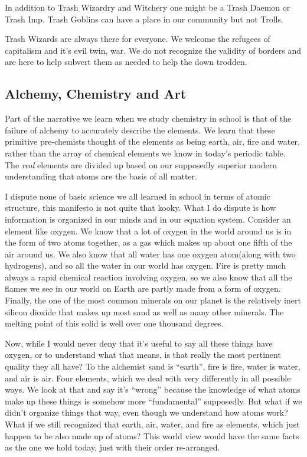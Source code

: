 In addition to Trash Wizardry and Witchery one might be a Trash Daemon
or Trash Imp. Trash Goblins can have a place in our community but not
Trolls.

Trash Wizards are always there for everyone. We welcome the refugees of
capitalism and it's evil twin, war. We do not recognize the validity of
borders and are here to help subvert them as needed to help the down
trodden.

\subsection{Alchemy, Chemistry and Art}\label{alchemy-chemistry-and-art}

Part of the narrative we learn when we study chemistry in school is that
of the failure of alchemy to accurately describe the elements. We learn
that these primitive pre-chemists thought of the elements as being
earth, air, fire and water, rather than the array of chemical elements
we know in today's periodic table. The \emph{real} elements are divided
up based on our supposedly superior modern understanding that atoms are
the basis of all matter.

I dispute none of basic science we all learned in school in terms of
atomic structure, this manifesto is not quite that kooky. What I do
dispute is how information is organized in our minds and in our equation
system. Consider an element like oxygen. We know that a lot of oxygen in
the world around us is in the form of two atoms together, as a gas which
makes up about one fifth of the air around us. We also know that all
water has one oxygen atom(along with two hydrogens), and so all the
water in our world has oxygen. Fire is pretty much always a rapid
chemical reaction involving oxygen, so we also know that all the flames
we see in our world on Earth are partly made from a form of oxygen.
Finally, the one of the most common minerals on our planet is the
relatively inert silicon dioxide that makes up most sand as well as many
other minerals. The melting point of this solid is well over one
thousand degrees.

Now, while I would never deny that it's useful to say all these things
have oxygen, or to understand what that means, is that really the most
pertinent quality they all have? To the alchemist sand is ``earth'',
fire is fire, water is water, and air is air. Four elements, which we
deal with very differently in all possible ways. We look at that and say
it's ``wrong'' because the knowledge of what atoms make up these things
is somehow more ``fundamental'' supposedly. But what if we didn't
organize things that way, even though we understand how atoms work? What
if we still recognized that earth, air, water, and fire as elements,
which just happen to be also made up of atoms? This world view would
have the same facts as the one we hold today, just with their order
re-arranged.

